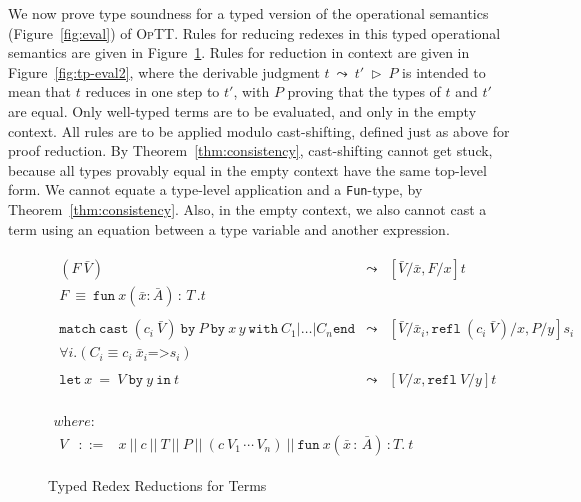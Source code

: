 \documentclass{fundam}
\newcommand{\optt}{\textsc{OpTT}}
\begin{document}
We now prove type soundness for a typed version of the operational
semantics (Figure~\ref{fig:eval}) of \optt.  Rules for reducing
redexes in this typed operational semantics are given in
Figure~\ref{fig:tp-eval}.  Rules for reduction in context are given in
Figure~\ref{fig:tp-eval2}, where the derivable judgment $t\ \leadsto\
t'\ \rhd\ P$ is intended to mean that $t$ reduces in one
step to $t'$, with $P$ proving that the types of $t$ and $t'$ are
equal.  Only well-typed terms are to be evaluated, and only in the
empty context.  All rules are to be applied modulo cast-shifting,
defined just as above for proof reduction.  By
Theorem~\ref{thm:consistency}, cast-shifting cannot get stuck, because
all types provably equal in the empty context have the same top-level
form.  We cannot equate a type-level application and a
\texttt{Fun}-type, by Theorem~\ref{thm:consistency}.  Also, in the
empty context, we also cannot cast a term using an equation between a
type variable and another expression.

\begin{figure}
\[
\begin{array}{l}
\begin{array}{lll}
(F\ \bar{V}) & \leadsto &
[\bar{V}/\bar{x},F/x]t \\ 
F \ \equiv\ \texttt{fun}\ x(\bar{x}:\bar{A})\,:\,T\,.t &\ & \ 
\\ \\
 \texttt{match}\ \texttt{cast}\ (c_i\ \bar{V})\ \texttt{by}\ P\  \texttt{by}\ x\,y\ \texttt{with}
\ C_1 | \ldots | C_n\texttt{end} 
& \leadsto &
[\bar{V}/\bar{x}_i,\texttt{refl}\ (c_i\ \bar{V})/x,P/y]s_i  \\ 
\forall i. (C_i \equiv c_i\ \bar{x}_i \texttt{=>} s_i ) \\ \\
\texttt{let}\ x\ =\ V\ \texttt{by}\ y\ \texttt{in}\ t & \leadsto &  
[V/x,\texttt{refl}\ V/y]t \\ \\
\end{array} \\ \\ 
\textit{where:}\\ 
\begin{array}{lll}
V & ::= & x\ ||\ c\ ||\ T\ ||\ P\ ||\ (c\ V_1\,\cdots\, V_n)\ ||\ \texttt{fun}\ x(\bar{x}\,:\,\bar{A})\,:T .\ t\ 
\end{array}
\end{array}
\]
\caption{\label{fig:tp-eval}Typed Redex Reductions for Terms}
\end{figure}
\end{document}
